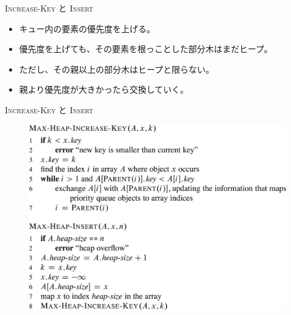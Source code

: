 \documentclass[unicode,11pt,aspectratio=169,notes]{beamer} %
\begin{document}
\begin{frame}{\textsc{Increase-Key} と \textsc{Insert}}
  \begin{itemize}
    \item キュー内の要素の優先度を上げる。
    \item 優先度を上げても、その要素を根っことした部分木はまだヒープ。
    \item ただし、その親以上の部分木はヒープと限らない。
    \item 親より優先度が大きかったら交換していく。
  \end{itemize}
\end{frame}


\begin{frame}{\textsc{Increase-Key} と \textsc{Insert}}
  \begin{figure}
    \includegraphics[height=0.8\textheight]{../resources/pseudo-06-06}
  \end{figure}
\end{frame}

\end{document}
